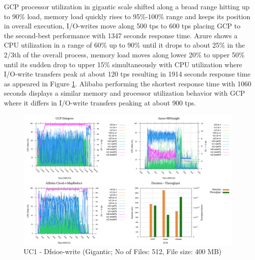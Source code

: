 \documentclass[review]{elsarticle}
\begin{document}
	GCP processor utilization in gigantic scale shifted along a broad range hitting up to 90\% load, memory load quickly rises to 95\%-100\% range and keeps its position in overall execution, I/O-writes move along 500 tps to 600 tps placing GCP to the second-best performance with 1347 seconds response time. Azure shows a CPU utilization in a range of 60\% up to 90\% until it drops to about 25\% in the 2/3th of the overall process, memory load moves along lower 20\% to upper 50\% until its sudden drop to upper 15\% simultaneously with CPU utilization where I/O-write transfers peak at about 120 tps resulting in 1914 seconds response time as appeared in Figure \ref{fig:uc1-dfsioew-g-cmidt}. Alibaba performing the shortest response time with 1060 seconds displays a similar memory and processor utilization behavior with GCP where it differs in I/O-write transfers peaking at about 900 tps.
	
	\begin{figure}[p]
		\caption{UC1 - Dfsioe-write (Gigantic; No of Files: 512, File size: 400 MB)}
		\label{fig:uc1-dfsioew-g-cmidt}
		\includegraphics[width=\textwidth]{uc1-dfsioew-g-cmidt}
		\centering
	\end{figure}
	
\end{document}
